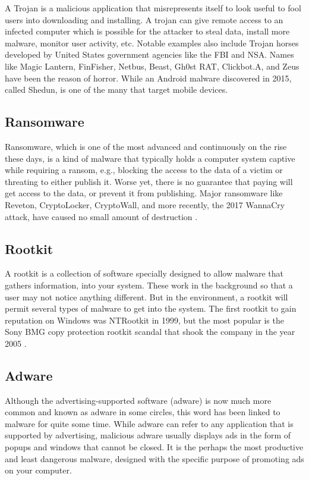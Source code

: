 A Trojan is a malicious application that misrepresents itself to look useful to fool users into downloading and installing. A trojan can give remote access to an infected computer which is possible for the attacker to steal data, install more malware, monitor user activity, etc. Notable examples also include Trojan horses developed by United States government agencies like the FBI and NSA. Names like Magic Lantern, FinFisher, Netbus, Beast, Gh0st RAT, Clickbot.A, and Zeus have been the reason of horror. While an Android malware discovered in 2015, called Shedun, is one of the many that target mobile devices.

\subsection{Ransomware}

Ransomware, which is one of the most advanced and continuously on the rise these days, is a kind of malware that typically holds a computer system captive while requiring a ransom, e.g., blocking the access to the data of a victim or threating to either publish it. Worse yet, there is no guarantee that paying will get access to the data, or prevent it from publishing. Major ransomware like Reveton, CryptoLocker, CryptoWall, and more recently, the 2017 WannaCry attack, have caused no small amount of destruction \cite{chen2017automated}.

\subsection{Rootkit}

A rootkit is a collection of software specially designed to allow malware that gathers information, into your system. These work in the background so that a user may not notice anything different. But in the environment, a rootkit will permit several types of malware to get into the system. The first rootkit to gain reputation on Windows was NTRootkit in 1999, but the most popular is the Sony BMG copy protection rootkit scandal that shook the company in the year 2005 \cite{bruce2005sony}.

\subsection{Adware}

Although the advertising-supported software (adware) is now much more common and known as adware in some circles, this word has been linked to malware for quite some time. While adware can refer to any application that is supported by advertising, malicious adware usually displays ads in the form of popups and windows that cannot be closed. It is the perhaps the most productive and least dangerous malware, designed with the specific purpose of promoting ads on your computer.

